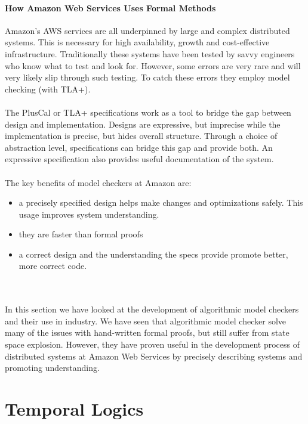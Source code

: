 \documentclass{uit-thesis}
\begin{document}
\paragraph{How Amazon Web Services Uses Formal Methods~\cite{Amazon2015}}
Amazon's AWS services are all underpinned by large and complex distributed systems. This is necessary for high availability, growth and cost-effective infrastructure. Traditionally these systems have been tested by savvy engineers who know what to test and look for. However, some errors are very rare and will very likely slip through such testing. To catch these errors they employ model checking (with TLA+).
\\\\
The PlusCal or TLA+ specifications work as a tool to bridge the gap between design and implementation. Designs are expressive, but imprecise while the implementation is precise, but hides overall structure. Through a choice of abstraction level, specifications can bridge this gap and provide both. An expressive specification also provides useful documentation of the system.
\\\\
The key benefits of model checkers at Amazon are:
\begin{itemize}
    \item a precisely specified design helps make changes and optimizations safely. This usage improves system understanding.
    \item they are faster than formal proofs
    \item a correct design and the understanding the specs provide promote better, more correct code.
\end{itemize}
\\\\
In this section we have looked at the development of algorithmic model checkers and their use in industry. We have seen that algorithmic model checker solve many of the issues with hand-written formal proofs, but still suffer from state space explosion. However, they have proven useful in the development process of distributed systems at Amazon Web Services by precisely describing systems and promoting understanding.

\section{Temporal Logics}\label{sec:TL}
\end{document}
